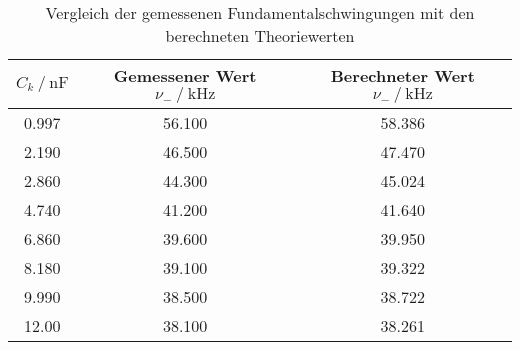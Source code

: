 \begin{table}
  \centering
  \caption{Vergleich der gemessenen Fundamentalschwingungen mit den berechneten Theoriewerten}
  \label{tab:schwingung}
  \begin{tabular}{c c c}
    \toprule 
    $C_k \:/\: \si{\nano\farad}$ & Gemessener Wert $\nu _- \:/\: \si{\kilo\hertz}$ & Berechneter Wert $\nu _- \:/\: \si{\kilo\hertz}$    \\ 
    \midrule 
    0.997 & 56.100 & 58.386 \\
    2.190 & 46.500 & 47.470 \\
    2.860 & 44.300 & 45.024 \\
    4.740 & 41.200 & 41.640 \\
    6.860 & 39.600 & 39.950 \\
    8.180 & 39.100 & 39.322 \\
    9.990 & 38.500 & 38.722 \\
    12.00 & 38.100 & 38.261 \\
    \bottomrule
  \end{tabular}
\end{table}



